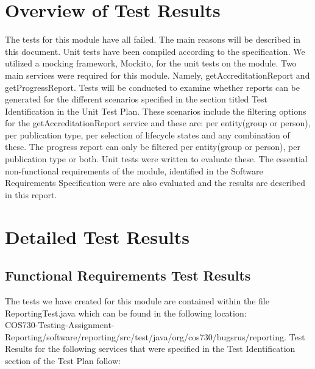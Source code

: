 
\section{Overview of Test Results}
\label{sec:overviewResults}
The tests for this module have all failed. The main reasons will be described in this document. Unit tests have been compiled according to the specification. We utilized a mocking framework, Mockito, for the unit tests on the module. Two main services were required for this module. Namely, getAccreditationReport and  getProgressReport. Tests will be conducted to examine whether reports can be generated for the different scenarios specified in the section titled Test Identification in the Unit Test Plan. These scenarios include the filtering options for the getAccreditationReport service and these are: per entity(group or person), per publication type, per selection of lifecycle states and any combination of these. The progress report can only be filtered per entity(group or person), per publication type or both. Unit tests were written to evaluate these. The essential non-functional requirements of the module, identified in the Software Requirements Specification were are also evaluated and the results are described in this report. 
\section{Detailed Test Results} 
\label{sec:detailedResults}  
\subsection{Functional Requirements Test Results}
The tests we have created for this module are contained within the file ReportingTest.java which can be found in the following location:
\\  COS730-Testing-Assignment-Reporting/software/reporting/src/test/java/org/cos730/bugsrus/reporting.
Test Results for the following services that were specified in the Test Identification section of the Test Plan follow:  
